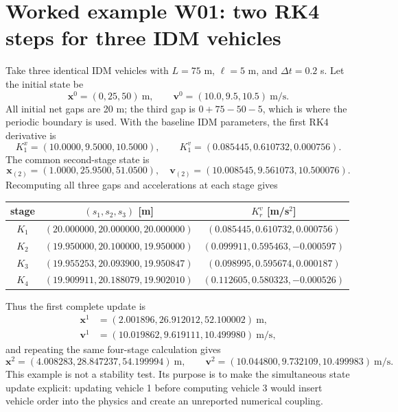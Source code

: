 \documentclass[11pt,a4paper,openany]{book}
\numberwithin{equation}{chapter}
\numberwithin{figure}{chapter}
\numberwithin{table}{chapter}
\begin{document}
\section{Worked example W01: two RK4 steps for three IDM vehicles}
Take three identical IDM vehicles with $L=75$ m, $\ell=5$ m, and $\Delta t=0.2$ s. Let the initial state be
\begin{equation}
\bm x^0=(0,25,50)\ \mathrm m,\qquad
\bm v^0=(10.0,9.5,10.5)\ \mathrm{m/s}.
\end{equation}
All initial net gaps are 20 m; the third gap is $0+75-50-5$, which is where the periodic boundary is used. With the baseline IDM parameters, the first RK4 derivative is
\begin{equation}
K_1^x=(10.0000,9.5000,10.5000),\qquad
K_1^v=(0.085445,0.610732,0.000756).
\end{equation}
The common second-stage state is
\begin{equation}
\bm x_{(2)}=(1.0000,25.9500,51.0500),\quad
\bm v_{(2)}=(10.008545,9.561073,10.500076).
\end{equation}
Recomputing all three gaps and accelerations at each stage gives
\begin{center}
\small
\begin{tabular}{c c c}
\toprule
stage & $(s_1,s_2,s_3)$ [m] & $K_r^v$ [m/s$^2$]\\
\midrule
$K_1$ & $(20.000000,20.000000,20.000000)$ & $(0.085445,0.610732,0.000756)$\\
$K_2$ & $(19.950000,20.100000,19.950000)$ & $(0.099911,0.595463,-0.000597)$\\
$K_3$ & $(19.955253,20.093900,19.950847)$ & $(0.098995,0.595674,0.000187)$\\
$K_4$ & $(19.909911,20.188079,19.902010)$ & $(0.112605,0.580323,-0.000526)$\\
\bottomrule
\end{tabular}
\end{center}
Thus the first complete update is
\begin{align}
\bm x^1&=(2.001896,26.912012,52.100002)\ \mathrm m,\\
\bm v^1&=(10.019862,9.619111,10.499980)\ \mathrm{m/s},
\end{align}
and repeating the same four-stage calculation gives
\begin{equation}
\bm x^2=(4.008283,28.847237,54.199994)\ \mathrm m,\qquad
\bm v^2=(10.044800,9.732109,10.499983)\ \mathrm{m/s}.
\end{equation}
This example is not a stability test. Its purpose is to make the simultaneous state update explicit: updating vehicle 1 before computing vehicle 3 would insert vehicle order into the physics and create an unreported numerical coupling.
\end{document}

